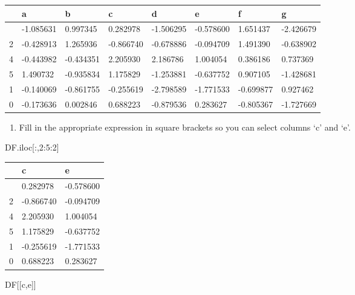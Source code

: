 \documentclass[
  a4paper,
  DIV=11,
  numbers=noendperiod]{scrreprt}
\newenvironment{Shaded}{\begin{snugshade}}{\end{snugshade}}
\newcommand{\DecValTok}[1]{\textcolor[rgb]{0.68,0.00,0.00}{#1}}
\newcommand{\NormalTok}[1]{\textcolor[rgb]{0.00,0.23,0.31}{#1}}
\newcommand{\StringTok}[1]{\textcolor[rgb]{0.13,0.47,0.30}{#1}}
\providecommand{\tightlist}{%
  \setlength{\itemsep}{0pt}\setlength{\parskip}{0pt}}\usepackage{longtable,booktabs,array}
\begin{document}
\begin{longtable}[]{@{}llllllll@{}}
\toprule\noalign{}
& a & b & c & d & e & f & g \\
\midrule\noalign{}
\endhead
\bottomrule\noalign{}
\endlastfoot
3 & -1.085631 & 0.997345 & 0.282978 & -1.506295 & -0.578600 & 1.651437 &
-2.426679 \\
2 & -0.428913 & 1.265936 & -0.866740 & -0.678886 & -0.094709 & 1.491390
& -0.638902 \\
4 & -0.443982 & -0.434351 & 2.205930 & 2.186786 & 1.004054 & 0.386186 &
0.737369 \\
5 & 1.490732 & -0.935834 & 1.175829 & -1.253881 & -0.637752 & 0.907105 &
-1.428681 \\
1 & -0.140069 & -0.861755 & -0.255619 & -2.798589 & -1.771533 &
-0.699877 & 0.927462 \\
0 & -0.173636 & 0.002846 & 0.688223 & -0.879536 & 0.283627 & -0.805367 &
-1.727669 \\
\end{longtable}

\begin{enumerate}
\def\labelenumi{\arabic{enumi}.}
\setcounter{enumi}{3}
\tightlist
\item
  Fill in the appropriate expression in square brackets so you can
  select columns `c' and `e'.
\end{enumerate}

\begin{Shaded}
\begin{Highlighting}[]
\NormalTok{DF.iloc[:,}\DecValTok{2}\NormalTok{:}\DecValTok{5}\NormalTok{:}\DecValTok{2}\NormalTok{]}
\end{Highlighting}
\end{Shaded}

\begin{longtable}[]{@{}lll@{}}
\toprule\noalign{}
& c & e \\
\midrule\noalign{}
\endhead
\bottomrule\noalign{}
\endlastfoot
3 & 0.282978 & -0.578600 \\
2 & -0.866740 & -0.094709 \\
4 & 2.205930 & 1.004054 \\
5 & 1.175829 & -0.637752 \\
1 & -0.255619 & -1.771533 \\
0 & 0.688223 & 0.283627 \\
\end{longtable}

\begin{Shaded}
\begin{Highlighting}[]
\NormalTok{DF[[}\StringTok{\textquotesingle{}c\textquotesingle{}}\NormalTok{,}\StringTok{\textquotesingle{}e\textquotesingle{}}\NormalTok{]]}
\end{Highlighting}
\end{Shaded}
\end{document}
